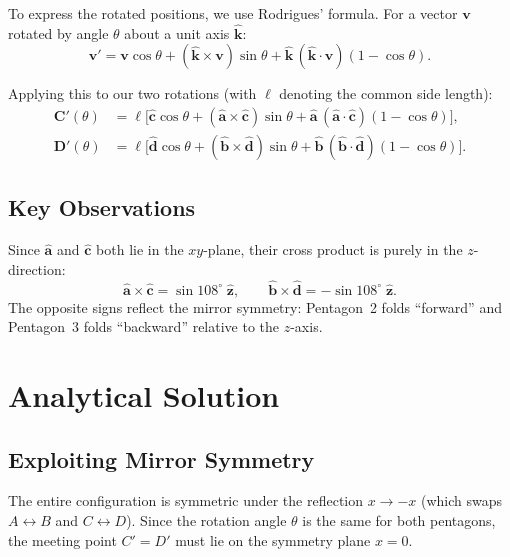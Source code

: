 \documentclass[11pt,a4paper]{article}
\newcommand{\vv}[1]{\mathbf{#1}}
\newcommand{\uv}[1]{\hat{\mathbf{#1}}}
\theoremstyle{definition}
\begin{document}
To express the rotated positions, we use Rodrigues' formula. For a vector $\vv{v}$
rotated by angle $\theta$ about a unit axis $\uv{k}$:
\begin{equation}
\boxed{
  \vv{v}' = \vv{v}\cos\theta + (\uv{k} \times \vv{v})\sin\theta
  + \uv{k}\,(\uv{k}\cdot\vv{v})(1-\cos\theta).
}
\label{eq:rodrigues}
\end{equation}

Applying this to our two rotations (with $\ell$ denoting the common side length):
\begin{align}
  \vv{C}'(\theta) &= \ell\Big[\uv{c}\cos\theta + (\uv{a}\times\uv{c})\sin\theta
  + \uv{a}\,(\uv{a}\cdot\uv{c})(1-\cos\theta)\Big], \label{eq:Cprime}\\[4pt]
  \vv{D}'(\theta) &= \ell\Big[\uv{d}\cos\theta + (\uv{b}\times\uv{d})\sin\theta
  + \uv{b}\,(\uv{b}\cdot\uv{d})(1-\cos\theta)\Big]. \label{eq:Dprime}
\end{align}

\subsection{Key Observations}

Since $\uv{a}$ and $\uv{c}$ both lie in the $xy$-plane, their cross product is
purely in the $z$-direction:
\begin{equation}
  \uv{a}\times\uv{c} = \sin 108^\circ\;\uv{z}, \qquad
  \uv{b}\times\uv{d} = -\sin 108^\circ\;\uv{z}.
  \label{eq:crossprods}
\end{equation}
The opposite signs reflect the mirror symmetry: Pentagon~2 folds ``forward'' and
Pentagon~3 folds ``backward'' relative to the $z$-axis.

\section{Analytical Solution}
\label{sec:analytic}

\subsection{Exploiting Mirror Symmetry}

The entire configuration is symmetric under the reflection $x \to -x$ (which swaps
$A \leftrightarrow B$ and $C \leftrightarrow D$). Since the rotation angle $\theta$
is the same for both pentagons, the meeting point $C' = D'$ must lie on the symmetry
plane $x = 0$.
\end{document}
